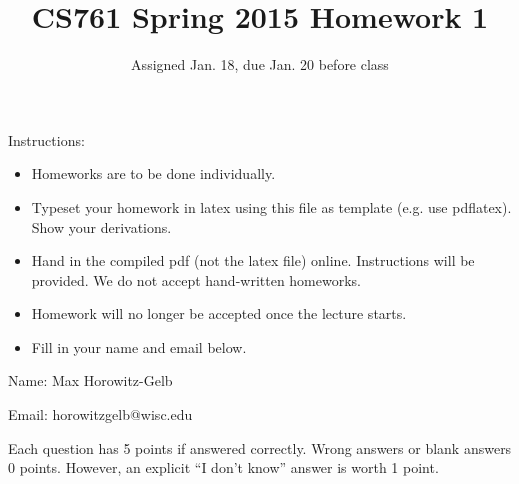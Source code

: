\documentclass{article}
\title{CS761 Spring 2015 Homework 1}
\author{Assigned Jan. 18, due Jan. 20 before class}
\date{}
\begin{document}
\maketitle

Instructions: 
\begin{itemize}
\item Homeworks are to be done individually.
\item Typeset your homework in latex using this file as template (e.g. use pdflatex).  Show your derivations.
\item Hand in the compiled pdf (not the latex file) online.  Instructions will be provided.  We do not accept hand-written homeworks.  
\item Homework will no longer be accepted once the lecture starts.
\item Fill in your name and email below.  
\end{itemize}


Name: Max Horowitz-Gelb                      

Email: horowitzgelb@wisc.edu

\newpage %

Each question has 5 points if answered correctly.
Wrong answers or blank answers 0 points.
However, an explicit ``I don't know'' answer is worth 1 point.
\end{document}
